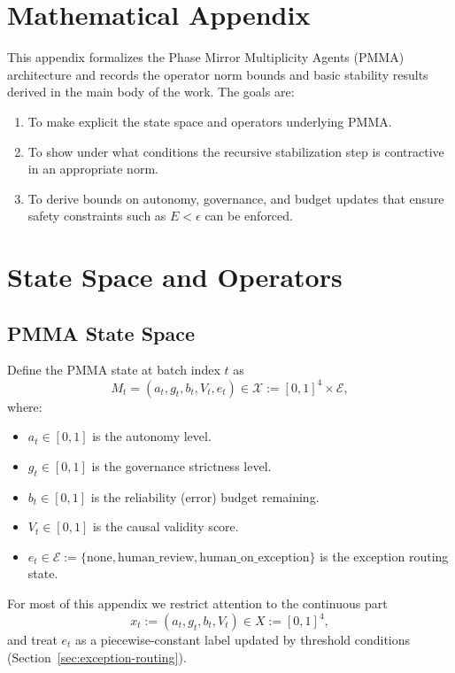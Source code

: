 \documentclass[11pt]{article}
\begin{document}
\appendix
\section*{Mathematical Appendix}

This appendix formalizes the Phase Mirror Multiplicity Agents (PMMA) architecture and records the operator norm bounds and basic stability results derived in the main body of the work.
The goals are:
\begin{enumerate}
  \item To make explicit the state space and operators underlying PMMA.
  \item To show under what conditions the recursive stabilization step is contractive in an appropriate norm.
  \item To derive bounds on autonomy, governance, and budget updates that ensure safety constraints such as $E < \epsilon$ can be enforced.
\end{enumerate}

\section{State Space and Operators}

\subsection{PMMA State Space}

Define the PMMA state at batch index $t$ as
\[
  M_t = (a_t, g_t, b_t, V_t, e_t) \in \mathcal{X} := [0,1]^4 \times \mathcal{E},
\]
where:
\begin{itemize}
  \item $a_t \in [0,1]$ is the autonomy level.
  \item $g_t \in [0,1]$ is the governance strictness level.
  \item $b_t \in [0,1]$ is the reliability (error) budget remaining.
  \item $V_t \in [0,1]$ is the causal validity score.
  \item $e_t \in \mathcal{E} := \{\mathrm{none},\mathrm{human\_review},\mathrm{human\_on\_exception}\}$ is the exception routing state.
\end{itemize}
For most of this appendix we restrict attention to the continuous part
\[
  x_t := (a_t, g_t, b_t, V_t) \in X := [0,1]^4,
\]
and treat $e_t$ as a piecewise-constant label updated by threshold conditions (Section~\ref{sec:exception-routing}).
\end{document}
